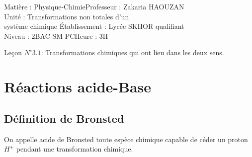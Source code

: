 \documentclass[12pt]{article}
\author{Zakaria HAOUZAN}
\date{\today}
\newcommand\headerMe[2]{\noindent{}#1\hfill#2}
\begin{document}
\headerMe{Matière : Physique-Chimie}{Professeur : Zakaria HAOUZAN}\\
\headerMe{Unité : Transformations non totales d'un\\système chimique  }{Établissement : Lycée SKHOR qualifiant}\\
\headerMe{Niveau : 2BAC-SM-PC}{Heure : 3H}\\

\begin{center}

    \Large{Leçon $N^{\circ} 3.1 $: \color{red} Transformations chimiques qui ont lieu dans les deux sens. }
\end{center}







\section{Réactions acide-Base}

\subsection{Définition de Bronsted}
On appelle acide de Bronsted toute espèce chimique capable de céder un proton $H^+$ pendant une transformation chimique.
\end{document}

